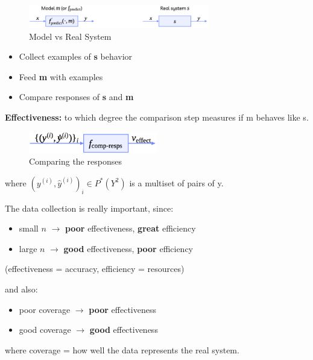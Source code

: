 \begin{figure}[H]
    \centering
    \includegraphics[width=0.7\textwidth]{assets/fig3.png}
    \caption{Model vs Real System}
\end{figure}

\begin{definitionblock}
    \begin{itemize}
        \item Collect examples of \textbf{s} behavior
        \item Feed \textbf{m} with examples 
        \item Compare responses of \textbf{s} and \textbf{m}
    \end{itemize}
    \textbf{Effectiveness:} to which degree the comparison step measures if m behaves like s.
\end{definitionblock}

\begin{center}
    \begin{figure}[H]
        \centering
        \includegraphics[width=0.5\textwidth]{assets/fig4.png}
        \caption{Comparing the responses}
    \end{figure}
\end{center}

\vspace{-1em}

where $(y^{(i)}, \hat{y}^{(i)})_i \in P^* (Y^2)$ is a multiset of pairs of y.

\begin{warningblock}[$f_{collect}$]
    The data collection is really important, since:
    \begin{itemize}
        \item small $n$ $\to$ \textbf{poor} effectiveness, \textbf{great} efficiency
        \item large $n$ $\to$ \textbf{good} effectiveness, \textbf{poor} efficiency
    \end{itemize}
    (effectiveness = accuracy, efficiency = resources)

    and also:
    \begin{itemize}
        \item poor coverage $\to$ \textbf{poor} effectiveness
        \item good coverage $\to$ \textbf{good} effectiveness
    \end{itemize}
    where coverage = how well the data represents the real system.
\end{warningblock}

